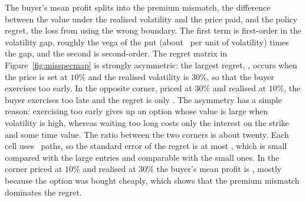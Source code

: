 The buyer's mean profit splits into the premium mismatch, the difference between the value under the realised volatility and the price paid, and the policy regret, the loss from using the wrong boundary.
The first term is first-order in the volatility gap, roughly the vega of the put (about \AmVegaTree\ per unit of volatility) times the gap, and the second is second-order.
The regret matrix in Figure~\ref{fig:misspecmap} is strongly asymmetric: the largest regret, \MapRegretLowHigh, occurs when the price is set at $10\%$ and the realised volatility is $30\%$, so that the buyer exercises too early.
In the opposite corner, priced at $30\%$ and realised at $10\%$, the buyer exercises too late and the regret is only \MapRegretHighLow.
The asymmetry has a simple reason: exercising too early gives up an option whose value is large when volatility is high, whereas waiting too long costs only the interest on the strike and some time value.
The ratio between the two corners is about twenty.
Each cell uses \MapPaths\ paths, so the standard error of the regret is at most \MapSE, which is small compared with the large entries and comparable with the small ones.
In the corner priced at $10\%$ and realised at $30\%$ the buyer's mean profit is \MapPnLmismatch, mostly because the option was bought cheaply, which shows that the premium mismatch dominates the regret.
